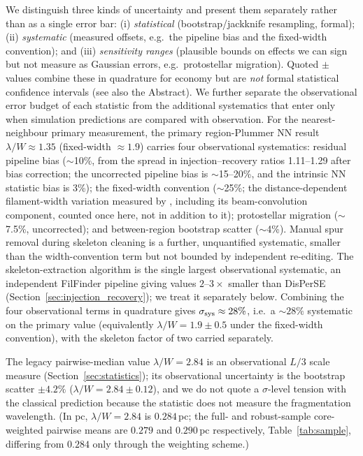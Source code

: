 \documentclass[usenatbib,twoside,twocolumn]{mnras}
\begin{document}
We distinguish three kinds of uncertainty and present them separately rather than as a single error bar: (i) \emph{statistical} (bootstrap/jackknife resampling, formal); (ii) \emph{systematic} (measured offsets, e.g.\ the pipeline bias and the fixed-width convention); and (iii) \emph{sensitivity ranges} (plausible bounds on effects we can sign but not measure as Gaussian errors, e.g.\ protostellar migration). Quoted $\pm$ values combine these in quadrature for economy but are \emph{not} formal statistical confidence intervals (see also the Abstract). We further separate the observational error budget of each statistic from the additional systematics that enter only when simulation predictions are compared with observation. For the nearest-neighbour primary measurement, the primary region-Plummer NN result $\lambda/W\approx1.35$ (fixed-width $\approx1.9$) carries four observational systematics: residual pipeline bias ($\sim$10\%, from the spread in injection--recovery ratios 1.11--1.29 after bias correction; the uncorrected pipeline bias is $\sim$15--20\%, and the intrinsic NN statistic bias is 3\%); the fixed-width convention ($\sim$25\%; the distance-dependent filament-width variation measured by \citealt{Panopoulou2022}, including its beam-convolution component, counted once here, not in addition to it); protostellar migration ($\sim$7.5\%, uncorrected); and between-region bootstrap scatter ($\sim$4\%). Manual spur removal during skeleton cleaning is a further, unquantified systematic, smaller than the width-convention term but not bounded by independent re-editing. The skeleton-extraction algorithm is the single largest observational systematic, an independent FilFinder pipeline giving values $2$--$3\times$ smaller than DisPerSE (Section~\ref{sec:injection_recovery}); we treat it separately below. Combining the four observational terms in quadrature gives $\sigma_{\rm sys}\approx28\%$, i.e.\ a $\sim28\%$ systematic on the primary value (equivalently $\lambda/W=1.9\pm0.5$ under the fixed-width convention), with the skeleton factor of two carried separately.

The legacy pairwise-median value $\lambda/W=2.84$ is an observational $L/3$ scale measure (Section~\ref{sec:statistics}); its observational uncertainty is the bootstrap scatter $\pm4.2\%$ ($\lambda/W=2.84\pm0.12$), and we do not quote a $\sigma$-level tension with the classical prediction because the statistic does not measure the fragmentation wavelength. (In pc, $\lambda/W=2.84$ is $0.284$\,pc; the full- and robust-sample core-weighted pairwise means are $0.279$ and $0.290$\,pc respectively, Table~\ref{tab:sample}, differing from $0.284$ only through the weighting scheme.)
\end{document}
